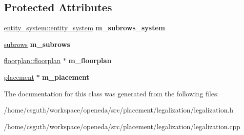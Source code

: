 \subsection*{Protected Attributes}
\begin{DoxyCompactItemize}
\item 
\hypertarget{classophidian_1_1placement_1_1legalization_1_1legalization_ad0eca3c204b83fcba32a5ab21d6f2f2b}{\hyperlink{classophidian_1_1entity__system_1_1entity__system}{entity\-\_\-system\-::entity\-\_\-system} {\bfseries m\-\_\-subrows\-\_\-system}}\label{classophidian_1_1placement_1_1legalization_1_1legalization_ad0eca3c204b83fcba32a5ab21d6f2f2b}

\item 
\hypertarget{classophidian_1_1placement_1_1legalization_1_1legalization_a19523222066ddb2ca40a6bd67d729650}{\hyperlink{classophidian_1_1placement_1_1legalization_1_1subrows}{subrows} {\bfseries m\-\_\-subrows}}\label{classophidian_1_1placement_1_1legalization_1_1legalization_a19523222066ddb2ca40a6bd67d729650}

\item 
\hypertarget{classophidian_1_1placement_1_1legalization_1_1legalization_adfc71d06c818910d2be60ae83c1f9bf2}{\hyperlink{classophidian_1_1floorplan_1_1floorplan}{floorplan\-::floorplan} $\ast$ {\bfseries m\-\_\-floorplan}}\label{classophidian_1_1placement_1_1legalization_1_1legalization_adfc71d06c818910d2be60ae83c1f9bf2}

\item 
\hypertarget{classophidian_1_1placement_1_1legalization_1_1legalization_a5166d7057c2d747523ebe5c76ffe2dd1}{\hyperlink{classophidian_1_1placement_1_1placement}{placement} $\ast$ {\bfseries m\-\_\-placement}}\label{classophidian_1_1placement_1_1legalization_1_1legalization_a5166d7057c2d747523ebe5c76ffe2dd1}

\end{DoxyCompactItemize}


The documentation for this class was generated from the following files\-:\begin{DoxyCompactItemize}
\item 
/home/csguth/workspace/openeda/src/placement/legalization/legalization.\-h\item 
/home/csguth/workspace/openeda/src/placement/legalization/legalization.\-cpp\end{DoxyCompactItemize}
